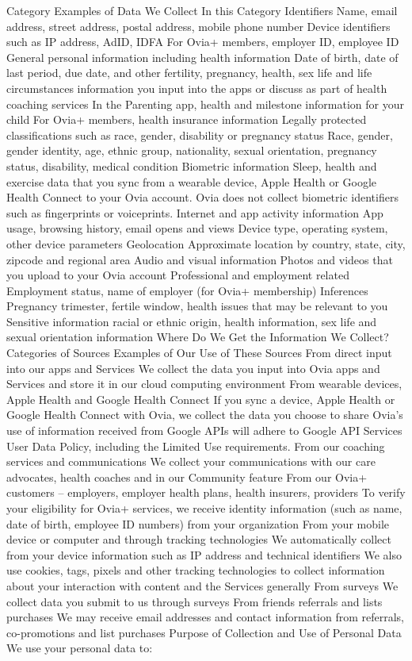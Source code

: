 Category	Examples of Data We Collect In this Category
Identifiers	Name, email address, street address, postal address, mobile phone number
Device identifiers such as IP address, AdID, IDFA
For Ovia+ members, employer ID, employee ID
General personal information including health information	Date of birth, date of last period, due date, and other fertility, pregnancy, health, sex life and life circumstances information you input into the apps or discuss as part of health coaching services
In the Parenting app, health and milestone information for your child
For Ovia+ members, health insurance information
Legally protected classifications such as race, gender, disability or pregnancy status	Race, gender, gender identity, age, ethnic group, nationality, sexual orientation, pregnancy status, disability, medical condition
Biometric information	Sleep, health and exercise data that you sync from a wearable device, Apple Health or Google Health Connect to your Ovia account. Ovia does not collect biometric identifiers such as fingerprints or voiceprints.
Internet and app activity information	App usage, browsing history, email opens and views
Device type, operating system, other device parameters
Geolocation	Approximate location by country, state, city, zipcode and regional area
Audio and visual information	Photos and videos that you upload to your Ovia account
Professional and employment related	Employment status, name of employer (for Ovia+ membership)
Inferences	Pregnancy trimester, fertile window, health issues that may be relevant to you
Sensitive information	racial or ethnic origin, health information, sex life and sexual orientation information
Where Do We Get the Information We Collect?
Categories of Sources	Examples of Our Use of These Sources
From direct input into our apps and Services	We collect the data you input into Ovia apps and Services and store it in our cloud computing environment
From wearable devices, Apple Health and Google Health Connect	If you sync a device, Apple Health or Google Health Connect with Ovia, we collect the data you choose to share
Ovia’s use of information received from Google APIs will adhere to Google API Services User Data Policy, including the Limited Use requirements.
From our coaching services and communications	We collect your communications with our care advocates, health coaches and in our Community feature
From our Ovia+ customers – employers, employer health plans, health insurers, providers	To verify your eligibility for Ovia+ services, we receive identity information (such as name, date of birth, employee ID numbers) from your organization
From your mobile device or computer and through tracking technologies	We automatically collect from your device information such as IP address and technical identifiers
We also use cookies, tags, pixels and other tracking technologies to collect information about your interaction with content and the Services generally
From surveys	We collect data you submit to us through surveys
From friends referrals and lists purchases	We may receive email addresses and contact information from referrals, co-promotions and list purchases
Purpose of Collection and Use of Personal Data
We use your personal data to:


